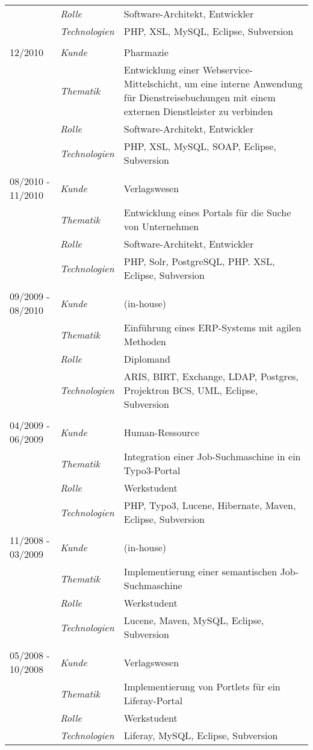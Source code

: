 \begin{longtable}{@{}>{}p{4cm}>{\itshape}p{2cm}>{}p{9cm}}
\nopagebreak		& Rolle 	    & Software-Architekt, Entwickler\\
\nopagebreak		& Technologien	& PHP, XSL, MySQL, Eclipse, Subversion\\
\\
12/2010         	& Kunde 	    & Pharmazie\\
\nopagebreak		& Thematik	    & Entwicklung einer Webservice-Mittelschicht, um eine interne Anwendung für Dienstreisebuchungen mit einem externen Dienstleister zu verbinden\\
\nopagebreak		& Rolle 	    & Software-Architekt, Entwickler\\
\nopagebreak		& Technologien	& PHP, XSL, MySQL, SOAP, Eclipse, Subversion\\
\\
08/2010 - 11/2010	& Kunde 	    & Verlagswesen\\
\nopagebreak		& Thematik	    & Entwicklung eines Portals für die Suche von Unternehmen\\
\nopagebreak		& Rolle 	    & Software-Architekt, Entwickler\\
\nopagebreak		& Technologien	& PHP, Solr, PostgreSQL, PHP. XSL, Eclipse, Subversion\\
\\
09/2009 - 08/2010	& Kunde 	    & (in-house)\\
\nopagebreak		& Thematik	    & Einführung eines ERP-Systems mit agilen Methoden\\
\nopagebreak		& Rolle 	    & Diplomand\\
\nopagebreak		& Technologien	& ARIS, BIRT, Exchange, LDAP, Postgres, Projektron BCS, UML, Eclipse, Subversion\\
\\
04/2009 - 06/2009	& Kunde 	    & Human-Ressource\\
\nopagebreak		& Thematik	    & Integration einer Job-Suchmaschine in ein Typo3-Portal\\
\nopagebreak		& Rolle 	    & Werkstudent\\
\nopagebreak		& Technologien	& PHP, Typo3, Lucene, Hibernate, Maven, Eclipse, Subversion\\
\\
11/2008 - 03/2009	& Kunde 	& (in-house)\\
\nopagebreak		& Thematik	& Implementierung einer semantischen Job-Suchmaschine\\
\nopagebreak		& Rolle 	& Werkstudent\\
\nopagebreak		& Technologien	& Lucene, Maven, MySQL, Eclipse, Subversion\\
\\
05/2008 - 10/2008	& Kunde 	& Verlagswesen\\
\nopagebreak		& Thematik	& Implementierung von Portlets für ein Liferay-Portal\\
\nopagebreak		& Rolle 	& Werkstudent\\
\nopagebreak		& Technologien	& Liferay, MySQL, Eclipse, Subversion\\
\end{longtable}
\renewcommand{\arraystretch}{2}


